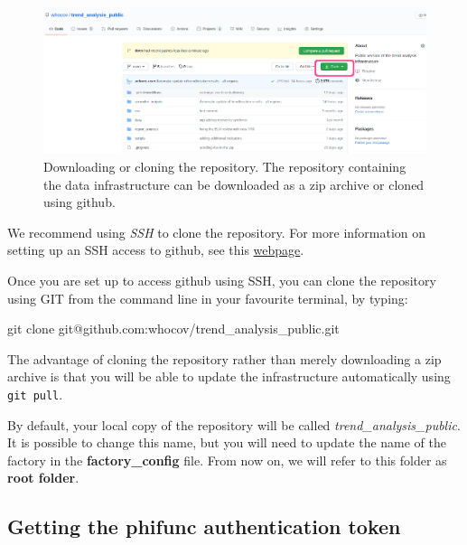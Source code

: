 \documentclass[]{book}
\newenvironment{Shaded}{\begin{snugshade}}{\end{snugshade}}
\newcommand{\FunctionTok}[1]{\textcolor[rgb]{0.00,0.00,0.00}{#1}}
\newcommand{\NormalTok}[1]{#1}
\begin{document}
\begin{figure}

{\centering \includegraphics[width=1\linewidth]{images/download} 

}

\caption{Downloading or cloning the repository. The repository containing the data infrastructure can be downloaded as a zip archive or cloned using github.}\label{fig:download}
\end{figure}

We recommend using \emph{SSH} to clone the repository. For more information on
setting up an SSH access to github, see this
\href{https://docs.github.com/en/github/authenticating-to-github/connecting-to-github-with-ssh}{webpage}.

Once you are set up to access github using SSH, you can clone the repository
using GIT from the command line in your favourite terminal, by typing:

\begin{Shaded}
\begin{Highlighting}[]
\FunctionTok{git}\NormalTok{ clone git@github.com:whocov/trend_analysis_public.git}
\end{Highlighting}
\end{Shaded}

The advantage of cloning the repository rather than merely downloading a zip
archive is that you will be able to update the infrastructure automatically
using \texttt{git\ pull}.

By default, your local copy of the repository will be called
\emph{trend\_analysis\_public}. It is possible to change this name, but you will need
to update the name of the factory in the \textbf{factory\_config} file. From now on,
we will refer to this folder as \textbf{root folder}.

\hypertarget{getting-the-phifunc-authentication-token}{%
\subsection{Getting the phifunc authentication token}\label{getting-the-phifunc-authentication-token}}
\end{document}
